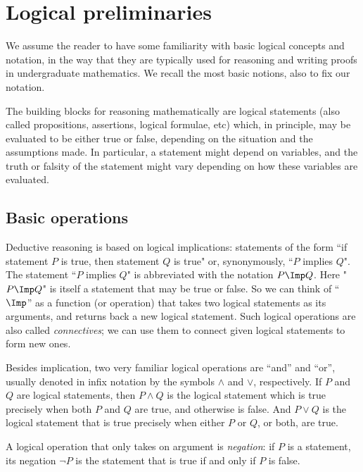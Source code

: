 

\section{Logical preliminaries}

We assume the reader to have some familiarity with basic logical concepts and notation, in the way that they are typically used for reasoning and writing proofs in undergraduate mathematics. We recall the most basic notions, also to fix our notation. 

The building blocks for reasoning mathematically are logical statements (also called propositions, assertions, logical formulae, etc) which, in principle, may be evaluated to be either true or false, depending on the situation and the assumptions made.  In particular, a statement might depend on variables, and the truth or falsity of the statement might vary depending on how these variables are evaluated. 

\subsection{Basic operations}

Deductive reasoning is based on logical implications: statements of the form ``if statement $P$ is true, then statement $Q$ is true" or, synonymously, ``$P$ implies $Q$". The statement ``$P$ implies $Q$" is abbreviated with the notation $P \Imp Q$. Here "$P \Imp Q$" is itself a statement that may be true or false. So we can think of ``$\Imp$'' as a function (or operation) that takes two logical statements as its arguments, and returns back a new logical statement. Such logical operations are also called \emph{connectives}; we can use them to connect given logical statements to form new ones. 

Besides implication, two very familiar logical operations are ``and'' and ``or'', usually denoted in infix notation by the symbols $\wedge$ and $\vee$, respectively. If $P$ and $Q$ are logical statements, then $P \wedge Q$ is the logical statement which is true precisely when both $P$ and $Q$ are true, and otherwise is false. And $P \vee Q$ is the logical statement that is true precisely when either $P$ or $Q$, or both, are true. 

A logical operation that only takes on argument is \emph{negation}: if $P$ is a statement, its negation $\lnot P$ is the statement that is true if and only if $P$ is false. 

